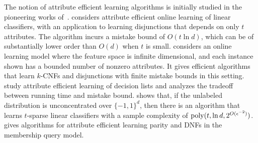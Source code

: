 




The notion of attribute efficient learning algorithms is initially studied in the pioneering works of~\cite{L87,B90}.
\cite{L87} considers attribute efficient online
learning of linear classifiers, with an application to learning disjunctions that depends on only $t$ attributes.
The algorithm incurs a mistake bound of $O(t \ln d)$, which can be of substantially lower order than $O(d)$ when $t$ is small.
\cite{B90} considers an online learning model where the feature space is infinite dimensional,
and each instance shown has a bounded number of nonzero attributes.
It gives efficient algorithms that learn $k$-CNFs and disjunctions
with finite mistake bounds in this setting.
\cite{S00, KS06, STT12} study attribute efficient learning of decision lists and analyzes the
tradeoff between running time and mistake bound.
\cite{LS07} shows that, if the unlabeled distribution is unconcentrated over $\{-1,1\}^d$, then there
is an algorithm that learns $t$-sparse linear classifiers with a sample complexity of $\operatorname{poly}(t, \ln d, 2^{O(\epsilon^{-2})})$. \cite{F07} gives algorithms for attribute efficient learning parity and DNFs
in the membership query model.


